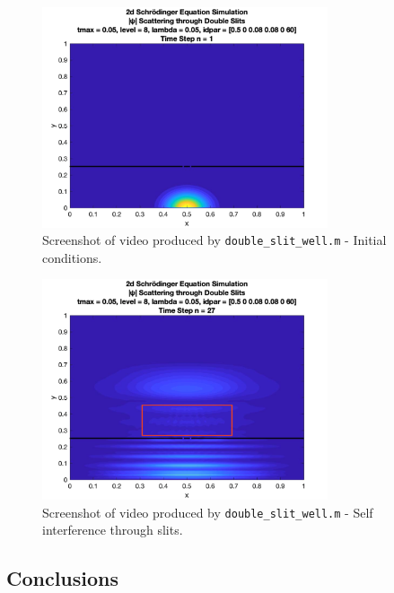 \documentclass[10pt]{article}
\def\code#1{\texttt{#1}} %
\begin{document}
\begin{figure}[H]
\centering
\includegraphics[width=0.75\textwidth]{problem2/double_slit_1.png}
\caption{Screenshot of video produced by \code{double\_slit\_well.m} - Initial conditions.}
\end{figure}
\begin{figure}[H]
\centering
\includegraphics[width=0.75\textwidth]{problem2/double_slit_2.png}
\caption{Screenshot of video produced by \code{double\_slit\_well.m} - 
Self interference through slits.}
\end{figure}


\subsection*{Conclusions}

\end{document}
